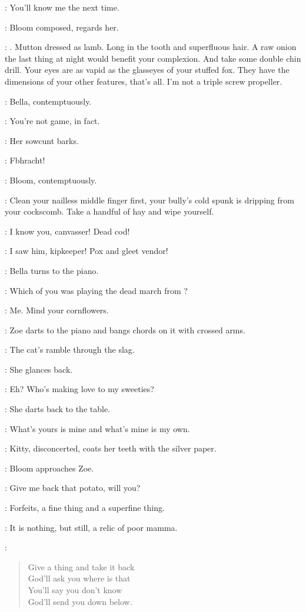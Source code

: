 \Bella:
You'll know me the next time.

:
Bloom composed, regards her.

\Bloom:
.
Mutton dressed as lamb.
Long in the tooth and superfluous hair.
A raw onion the last thing at night would benefit your complexion.
And take some double chin drill.
Your eyes are as vapid as the glasseyes of your stuffed fox.
They have the dimensions of your other features, that's all.
I'm not a triple screw propeller.

:
Bella, contemptuously.

\Bella:
You're not game, in fact.

:
Her sowcunt barks.

\Bella:
Fbhracht!%

:
Bloom, contemptuously.

\Bloom:
Clean your nailless middle finger first,
your bully's cold spunk is dripping from your cockscomb.
Take a handful of hay and wipe yourself.

\Bella:
I know you, canvasser!
Dead cod!

\Bloom:
I saw him, kipkeeper!
Pox and gleet vendor!

:
Bella turns to the piano.

\Bella:
Which of you was playing the dead march from ?

\Zoe[1]:
Me.
Mind your cornflowers.

:
Zoe darts to the piano and bangs chords on it with crossed arms.

\Zoe:
The cat's ramble through the slag.

:
She glances back.

\Zoe:
Eh?
Who's making love to my sweeties?

:
She darts back to the table.

\Zoe:
What's yours is mine and what's mine is my own.

:
Kitty, disconcerted, coats her teeth with the silver paper.

:
Bloom approaches Zoe.

\Bloom:
Give me back that potato, will you?

\Zoe:
Forfeits, a fine thing and a superfine thing.

\Bloom:
It is nothing, but still, a relic of poor mamma.

\Zoe:
\begin{verse}
    Give a thing and take it back\\
    God'll ask you where is that\\
    You'll say you don't know\\
    God'll send you down below.
\end{verse}

